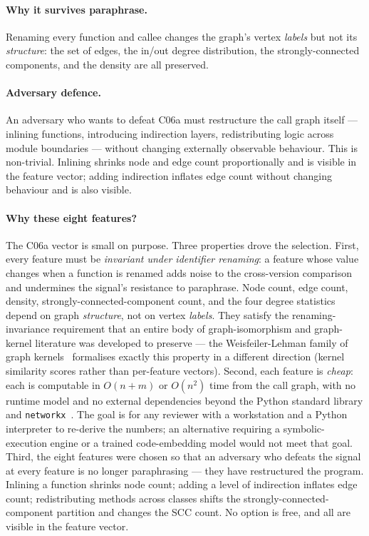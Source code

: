 \documentclass[11pt,letterpaper]{article}
\begin{document}
\paragraph{Why it survives paraphrase.} Renaming every function and
callee changes the graph's vertex \emph{labels} but not its
\emph{structure}: the set of edges, the in/out degree distribution,
the strongly-connected components, and the density are all
preserved.

\paragraph{Adversary defence.} An adversary who wants to defeat C06a
must restructure the call graph itself --- inlining functions,
introducing indirection layers, redistributing logic across module
boundaries --- without changing externally observable behaviour. This
is non-trivial. Inlining shrinks node and edge count proportionally
and is visible in the feature vector; adding indirection inflates
edge count without changing behaviour and is also visible.

\paragraph{Why these eight features?}
\label{sec:c06a-rationale}
The C06a vector is small on purpose. Three properties drove the
selection. First, every feature must be \emph{invariant under
identifier renaming}: a feature whose value changes when a function is
renamed adds noise to the cross-version comparison and undermines the
signal's resistance to paraphrase. Node count, edge count, density,
strongly-connected-component count, and the four degree statistics
depend on graph \emph{structure}, not on vertex \emph{labels}. They
satisfy the renaming-invariance requirement that an entire body of
graph-isomorphism and graph-kernel literature was developed to
preserve --- the Weisfeiler-Lehman family of graph
kernels~\cite{shervashidze2011weisfeiler} formalises exactly this
property in a different direction (kernel similarity scores rather
than per-feature vectors). Second, each feature is \emph{cheap}: each
is computable in $O(n+m)$ or $O(n^2)$ time from the call graph, with no
runtime model and no external dependencies beyond the Python standard
library and \texttt{networkx}~\cite{networkx,hagberg2008networkx}. The
goal is for any reviewer with a workstation and a Python interpreter
to re-derive the numbers; an alternative requiring a symbolic-execution
engine or a trained code-embedding model would not meet that
goal. Third, the eight features were chosen so that an adversary who
defeats the signal at every feature is no longer paraphrasing --- they
have restructured the program. Inlining a function shrinks node count;
adding a level of indirection inflates edge count; redistributing
methods across classes shifts the strongly-connected-component
partition and changes the SCC count. No option is free, and all are
visible in the feature vector.
\end{document}
